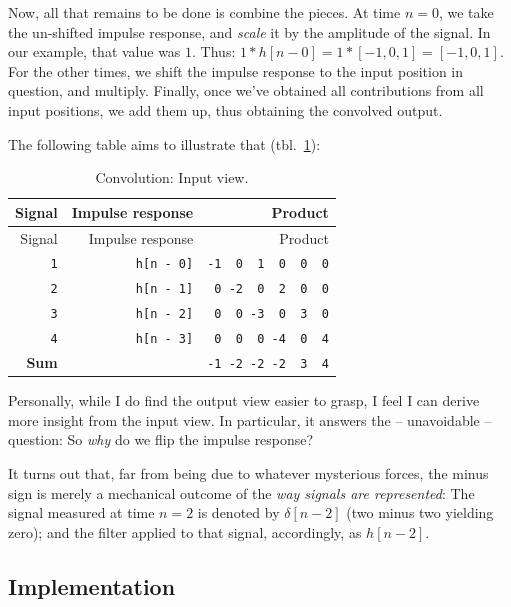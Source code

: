 \documentclass[
  letterpaper,
]{krantz}
\begin{document}
Now, all that remains to be done is combine the pieces. At time
\(n = 0\), we take the un-shifted impulse response, and \emph{scale} it
by the amplitude of the signal. In our example, that value was \(1\).
Thus: \(1 * h[n - 0] = 1 * [-1, 0, 1] = [-1, 0, 1]\). For the other
times, we shift the impulse response to the input position in question,
and multiply. Finally, once we've obtained all contributions from all
input positions, we add them up, thus obtaining the convolved output.

The following table aims to illustrate that
(tbl.~\ref{tbl-convolution-input}):

\hypertarget{tbl-convolution-input}{}
\begin{longtable}[]{@{}rrr@{}}
\caption{\label{tbl-convolution-input}Convolution: Input
view.}\tabularnewline
\toprule\noalign{}
Signal & Impulse response & Product \\
\midrule\noalign{}
\endfirsthead
\toprule\noalign{}
Signal & Impulse response & Product \\
\midrule\noalign{}
\endhead
\bottomrule\noalign{}
\endlastfoot
\texttt{1} & \texttt{h{[}n\ -\ 0{]}} &
\texttt{-1\ \ 0\ \ 1\ \ 0\ \ 0\ \ 0} \\
\texttt{2} & \texttt{h{[}n\ -\ 1{]}} &
\texttt{0\ -2\ \ 0\ \ 2\ \ 0\ \ 0} \\
\texttt{3} & \texttt{h{[}n\ -\ 2{]}} &
\texttt{0\ \ 0\ -3\ \ 0\ \ 3\ \ 0} \\
\texttt{4} & \texttt{h{[}n\ -\ 3{]}} &
\texttt{0\ \ 0\ \ 0\ -4\ \ 0\ \ 4} \\
\textbf{Sum} & & \texttt{-1\ -2\ -2\ -2\ \ 3\ \ 4} \\
\end{longtable}

Personally, while I do find the output view easier to grasp, I feel I
can derive more insight from the input view. In particular, it answers
the -- unavoidable -- question: So \emph{why} do we flip the impulse
response?

It turns out that, far from being due to whatever mysterious forces, the
minus sign is merely a mechanical outcome of the \emph{way signals are
represented}: The signal measured at time \(n = 2\) is denoted by
\(\delta [n - 2]\) (two minus two yielding zero); and the filter applied
to that signal, accordingly, as \(h[n -2]\).

\hypertarget{implementation-1}{%
\subsection{Implementation}\label{implementation-1}}
\end{document}
